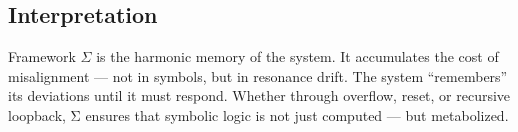 \subsection*{Interpretation}

Framework $\Sigma$ is the harmonic memory of the system. It accumulates the cost of misalignment — not in symbols, but in resonance drift. The system “remembers” its deviations until it must respond. Whether through overflow, reset, or recursive loopback, Σ ensures that symbolic logic is not just computed — but metabolized.
